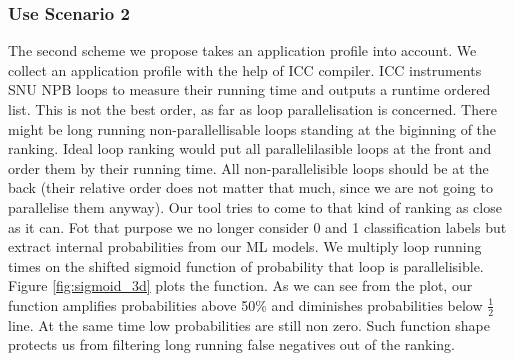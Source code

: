 \documentclass[sigconf,10pt,review,anonymous]{acmart}
\begin{document}

\subsubsection{Use Scenario 2}
\label{application_profile_filter}
\quad The second scheme we propose takes an application profile into account. We collect an application profile with the help of ICC compiler. ICC instruments SNU NPB loops to measure their running time and outputs a runtime ordered list. This is not the best order, as far as loop parallelisation is concerned. There might be long running non-parallellisable loops standing at the biginning of the ranking. Ideal loop ranking would put all parallelilasible loops at the front and order them by their running time. All non-parallelisible loops should be at the back (their relative order does not matter that much, since we are not going to parallelise them anyway).\newline\null
\quad Our tool tries to come to that kind of ranking as close as it can. Fot that purpose we no longer consider 0 and 1 classification labels but extract internal probabilities from our ML models. We multiply loop running times on the shifted sigmoid function of probability that loop is parallelisible. Figure \ref{fig:sigmoid_3d} plots the function. As we can see from the plot, our function amplifies probabilities above 50\% and diminishes probabilities below $\frac{1}{2}$ line. At the same time low probabilities are still non zero. Such function shape protects us from filtering long running false negatives out of the ranking.
\end{document}
